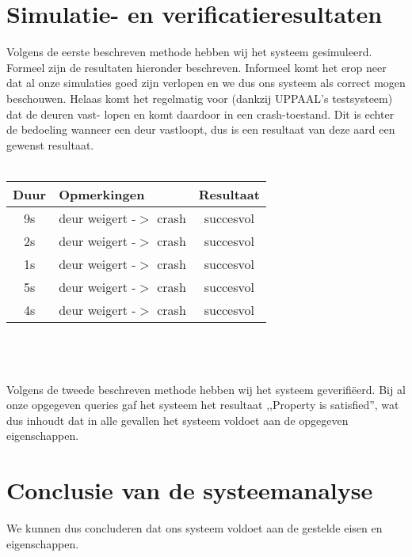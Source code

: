     \section{Simulatie- en verificatieresultaten}
        Volgens de eerste beschreven methode hebben wij het systeem gesimuleerd. Formeel zijn de resultaten hieronder
        beschreven. Informeel komt het erop neer dat al onze simulaties goed zijn verlopen en we dus ons systeem als
        correct mogen beschouwen. Helaas komt het regelmatig voor (dankzij UPPAAL's testsysteem) dat de deuren vast-
        lopen en komt daardoor in een crash-toestand. Dit is echter de bedoeling wanneer een deur vastloopt, dus is
        een resultaat van deze aard een gewenst resultaat.\\
        \\
        \begin{tabular}{ c | l | c }
            Duur & Opmerkingen & Resultaat\\
            \hline
            9s & deur weigert -$>$ crash & succesvol\\
            2s & deur weigert -$>$ crash & succesvol\\
            1s & deur weigert -$>$ crash & succesvol\\
            5s & deur weigert -$>$ crash & succesvol\\
            4s & deur weigert -$>$ crash & succesvol\\
        \end{tabular}\\\\
        \\
        Volgens de tweede beschreven methode hebben wij het systeem geverifi\"eerd. Bij al onze opgegeven queries
        gaf het systeem het resultaat ,,Property is satisfied'', wat dus inhoudt dat in alle gevallen het systeem
        voldoet aan de opgegeven eigenschappen.\\

    \section{Conclusie van de systeemanalyse}
        We kunnen dus concluderen dat ons systeem voldoet aan de gestelde eisen en eigenschappen.
